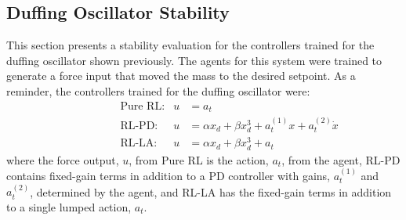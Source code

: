 \subsection{Duffing Oscillator Stability}
%
This section presents a stability evaluation for the controllers trained for the duffing oscillator shown previously. The agents for this system were trained to generate a force input that moved the mass to the desired setpoint. As a reminder, the controllers trained for the duffing oscillator were:
%
\begin{align*}
  &\qquad\qquad\text{Pure RL:} & u&=a_t \qquad\qquad\qquad\\
  &\qquad\qquad\text{RL-PD:} & u&=\alpha x_d + \beta x_d^3 + a_t^{(1)}x + a_t^{(2)} \dot{x}\\
  &\qquad\qquad\text{RL-LA:} & u&=\alpha x_d + \beta x_d^3 + a_t \qquad\qquad\qquad
\end{align*}
%
where the force output, $u$, from Pure RL is the action, $a_t$, from the agent, RL-PD contains fixed-gain terms in addition to a PD controller with gains, $a_t^{(1)}$ and $a_t^{(2)}$, determined by the agent, and RL-LA has the fixed-gain terms in addition to a single lumped action, $a_t$.

